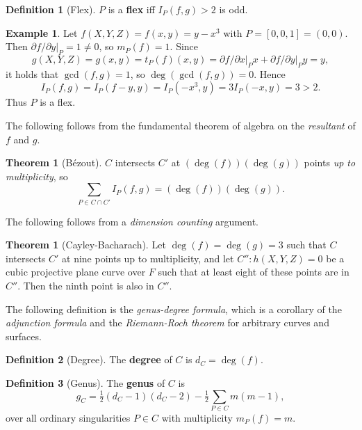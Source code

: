 \documentclass{article}
\newcommand{\val}[1]{\left. #1 \right\rvert}
\newcommand{\rb}[1]{\left( #1 \right)}
\renewcommand{\sb}[1]{\left[ #1 \right]}
\theoremstyle{definition}\newtheorem*{definition}{Definition}
\theoremstyle{definition}\newtheorem*{example}{Example}
\theoremstyle{definition}\newtheorem*{remark}{Remark}
\newtheorem{theorem}[proposition]{Theorem}
\begin{document}
\begin{definition}[Flex]
$ P $ is a \textbf{flex} iff $ I_P\rb{f, g} > 2 $ is odd.
\end{definition}

\begin{example}
Let $ f\rb{X, Y, Z} = f\rb{x, y} = y - x^3 $ with $ P = \sb{0, 0, 1} = \rb{0, 0} $. Then $ \val{\partial f / \partial y}_P = 1 \ne 0 $, so $ m_P\rb{f} = 1 $. Since
$$ g\rb{X, Y, Z} = g\rb{x, y} = t_P\rb{f}\rb{x, y} = \val{\partial f / \partial x}_Px + \val{\partial f / \partial y}_Py = y, $$
it holds that $ \gcd\rb{f, g} = 1 $, so $ \deg\rb{\gcd\rb{f, g}} = 0 $. Hence
$$ I_P\rb{f, g} = I_P\rb{f - y, y} = I_P\rb{-x^3, y} = 3I_P\rb{-x, y} = 3 > 2. $$
Thus $ P $ is a flex.
\end{example}

The following follows from the fundamental theorem of algebra on the \emph{resultant} of $ f $ and $ g $.

\begin{theorem}[Bézout]
$ C $ intersects $ C' $ at $ \rb{\deg\rb{f}}\rb{\deg\rb{g}} $ points \emph{up to multiplicity}, so
$$ \sum_{P \in C \cap C'} I_P\rb{f, g} = \rb{\deg\rb{f}}\rb{\deg\rb{g}}. $$
\end{theorem}

The following follows from a \emph{dimension counting} argument.

\begin{theorem}[Cayley-Bacharach]
Let $ \deg\rb{f} = \deg\rb{g} = 3 $ such that $ C $ intersects $ C' $ at nine points up to multiplicity, and let $ C'' : h\rb{X, Y, Z} = 0 $ be a cubic projective plane curve over $ F $ such that at least eight of these points are in $ C'' $. Then the ninth point is also in $ C'' $.
\end{theorem}

The following definition is the \emph{genus-degree formula}, which is a corollary of the \emph{adjunction formula} and the \emph{Riemann-Roch theorem} for arbitrary curves and surfaces.

\begin{definition}[Degree]
The \textbf{degree} of $ C $ is $ d_C = \deg\rb{f} $.
\end{definition}

\begin{definition}[Genus]
The \textbf{genus} of $ C $ is
$$ g_C = \tfrac{1}{2}\rb{d_C - 1}\rb{d_C - 2} - \tfrac{1}{2}\sum_{P \in C} m\rb{m - 1}, $$
over all ordinary singularities $ P \in C $ with multiplicity $ m_P\rb{f} = m $.
\end{definition}
\end{document}
